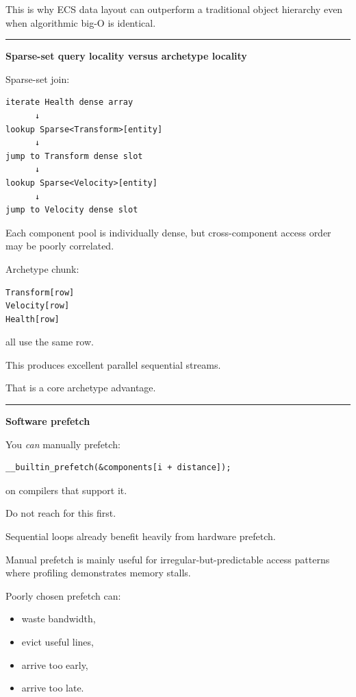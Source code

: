This is why ECS data layout can outperform a traditional object hierarchy even when algorithmic big-O is identical.

\begin{center}\rule{0.5\linewidth}{0.5pt}\end{center}

\textbf{Sparse-set query locality versus archetype locality}

Sparse-set join:

\begin{verbatim}
iterate Health dense array
      ↓
lookup Sparse<Transform>[entity]
      ↓
jump to Transform dense slot
      ↓
lookup Sparse<Velocity>[entity]
      ↓
jump to Velocity dense slot
\end{verbatim}

Each component pool is individually dense, but cross-component access order may be poorly correlated.

Archetype chunk:

\begin{verbatim}
Transform[row]
Velocity[row]
Health[row]
\end{verbatim}

all use the same row.

This produces excellent parallel sequential streams.

That is a core archetype advantage.

\begin{center}\rule{0.5\linewidth}{0.5pt}\end{center}

\textbf{Software prefetch}

You \emph{can} manually prefetch:

\begin{verbatim}
__builtin_prefetch(&components[i + distance]);
\end{verbatim}

on compilers that support it.

Do not reach for this first.

Sequential loops already benefit heavily from hardware prefetch.

Manual prefetch is mainly useful for irregular-but-predictable access patterns where profiling demonstrates memory stalls.

Poorly chosen prefetch can:

\begin{itemize}
\tightlist
\item
  waste bandwidth,
\item
  evict useful lines,
\item
  arrive too early,
\item
  arrive too late.
\end{itemize}

